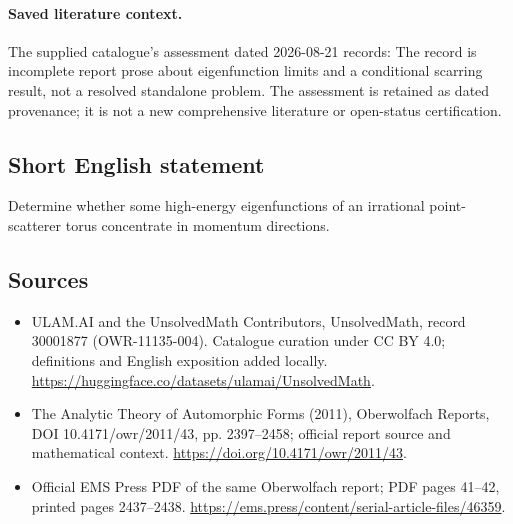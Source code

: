 \documentclass[11pt]{article}
\begin{document}
\paragraph{Saved literature context.} The supplied catalogue's assessment dated 2026-08-21 records: The record is incomplete report prose about eigenfunction limits and a conditional scarring result, not a resolved standalone problem. The assessment is retained as dated provenance; it is not a new comprehensive literature or open-status certification.
\subsection{Short English statement}
Determine whether some high-energy eigenfunctions of an irrational point-scatterer torus concentrate in momentum directions.
\subsection{Sources}
\begin{itemize}
\item[\hypertarget{source:30001877:1}{S1}] ULAM.AI and the UnsolvedMath Contributors, UnsolvedMath, record 30001877 (OWR-11135-004). Catalogue curation under CC BY 4.0; definitions and English exposition added locally.
\url{https://huggingface.co/datasets/ulamai/UnsolvedMath}.
\item[\hypertarget{source:30001877:2}{S2}] The Analytic Theory of Automorphic Forms (2011), Oberwolfach Reports, DOI 10.4171/owr/2011/43, pp. 2397--2458; official report source and mathematical context.
\url{https://doi.org/10.4171/owr/2011/43}.
\item[\hypertarget{source:30001877:3}{S3}] Official EMS Press PDF of the same Oberwolfach report; PDF pages 41--42, printed pages 2437--2438.
\url{https://ems.press/content/serial-article-files/46359}.
\end{itemize}
\label{end:30001877}
\end{document}
